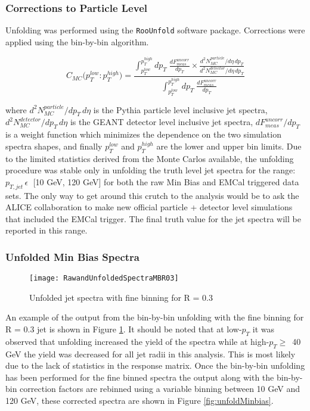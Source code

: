 \subsubsection{Corrections to Particle Level}

Unfolding was performed using the \verb+RooUnfold+\cite{Adye:2011gm} software package.  Corrections were applied using the bin-by-bin\cite{Cowan:2002in} algorithm. 

\begin{equation}
C_{MC} \big( p_{T}^{low} : p_{T}^{high} \big) =  \frac{  \int^{p_{T}^{high}}_{p_{T}^{low}} dp_{T} \; \frac{dF^{uncorr}_{meas}}{dp_{T}} \times \frac{d^{2}N^{particle}_{MC}/d\eta \, dp_{T}}{d^{2}N^{detector}_{MC}/d\eta \, dp_{T}}  } { \int^{p_{T}^{high}}_{p_{T}^{low}} dp_{T} \; \frac{dF^{uncorr}_{meas}}{dp_{T}} }
\label{eq:binbybin}
\end{equation}

\noindent
where $d^{2}N^{particle}_{MC}/dp_{T} \, d\eta$ is the Pythia particle level inclusive jet spectra, $d^{2}N^{detector}_{MC}/dp_{T} \, d\eta$ is the GEANT detector level inclusive jet spectra, $dF^{uncorr}_{meas} / dp_{T}$ is a weight function which minimizes the dependence on the two simulation spectra shapes, and finally $p_{T}^{low}$ and $p_{T}^{high}$ are the lower and upper bin limits.  Due to the limited statistics derived from the Monte Carlos available, the unfolding procedure was stable only in unfolding the truth level jet spectra for the range: $p_{T,jet} \, \epsilon \;$ [10 GeV, 120 GeV] for both the raw Min Bias and EMCal triggered data sets.  The only way to get around this crutch to the analysis would be to ask the ALICE collaboration to make new official particle + detector level simulations that included the EMCal trigger.  The final truth value for the jet spectra will be reported in this range.



\subsubsection{Unfolded Min Bias Spectra}

\begin{figure}[h]
\texttt{[image: RawandUnfoldedSpectraMBR03]}
\centering
\caption{Unfolded jet spectra with fine binning for R = 0.3}
\label{fig:Unfoldfine}
\end{figure}

An example of the output from the bin-by-bin unfolding with the fine binning for R = 0.3 jet is shown in Figure \ref{fig:Unfoldfine}.  It should be noted that at low-$p_{T}$ it was observed that unfolding increased the yield of the spectra while at high-$p_{T} \geq \,$ 40 GeV the yield was decreased for all jet radii in this analysis.  This is most likely due to the lack of statistics in the response matrix.  Once the bin-by-bin unfolding has been performed for the fine binned spectra the output along with the bin-by-bin correction factors are rebinned using a variable binning between 10 GeV and 120 GeV, these corrected spectra are shown in Figure \ref{fig:unfoldMinbias}.


